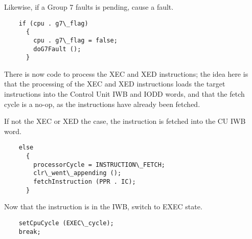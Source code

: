 \documentclass[notitlepage]{report}
\begin{document}
Likewise, if a Group 7 faults is pending, cause a fault.

\begin{verbatim}
    if (cpu . g7\_flag)
      {
        cpu . g7\_flag = false;
        doG7Fault ();
      }
\end{verbatim}

There is now code to process the XEC and XED instructions; the idea here is
that the processing of the XEC and XED instructions loads the target 
instructions into the Control Unit IWB and IODD words, and that the 
fetch cycle is a no-op, as the instructions have already been 
fetched.

If not the XEC or XED the case, the instruction is fetched into the
CU IWB word.

\begin{verbatim}
    else
      {
        processorCycle = INSTRUCTION\_FETCH;
        clr\_went\_appending ();
        fetchInstruction (PPR . IC);
      }
\end{verbatim}

Now that the instruction is in the IWB, switch to EXEC state.

\begin{verbatim}
    setCpuCycle (EXEC\_cycle);
    break;
\end{verbatim}
\end{document}
